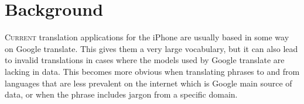 \chapter{Background}
\lettrine[lines=4, loversize=-0.1, lraise=0.1]{C}{urrent} translation applications for the iPhone are usually based in some way on Google translate. This gives them a very large vocabulary, but it can also lead to invalid translations in cases where the models used by Google translate are lacking in data. This becomes more obvious when translating phrases to and from languages that are less prevalent on the internet which is Google main source of data, or when the phrase includes jargon from a specific domain.
